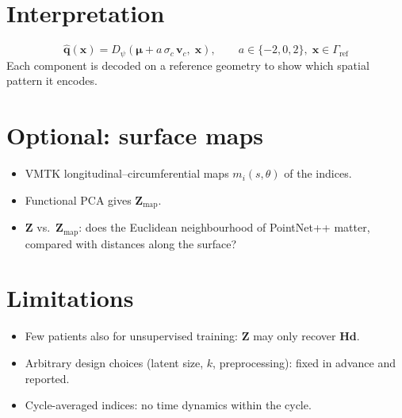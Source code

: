 \section{Interpretation}
\begin{equation}
    \hat{\mathbf{q}}(\mathbf{x}) = D_\psi\left(\boldsymbol{\mu} + a\,\sigma_c\,\mathbf{v}_c,\; \mathbf{x}\right),
    \qquad a \in \{-2, 0, 2\},\; \mathbf{x} \in \Gamma_{\mathrm{ref}}
\end{equation}
Each component is decoded on a reference geometry to show which spatial pattern it encodes.

\section{Optional: surface maps}
\begin{itemize}
    \item VMTK longitudinal--circumferential maps $m_i(s,\theta)$ of the indices. 
    \item Functional PCA gives $\mathbf{Z}_{\text{map}}$.
    \item $\mathbf{Z}$ vs.\ $\mathbf{Z}_{\text{map}}$: does the Euclidean neighbourhood of PointNet++ matter, compared with distances along the surface?
\end{itemize}

\section{Limitations}
\begin{itemize}
    \item Few patients also for unsupervised training: $\mathbf{Z}$ may only recover $\mathbf{Hd}$.
    \item Arbitrary design choices (latent size, $k$, preprocessing): fixed in advance and reported.
    \item Cycle-averaged indices: no time dynamics within the cycle.
\end{itemize}
